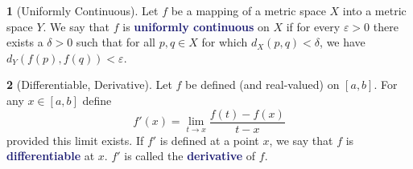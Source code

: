 \documentclass[12pt]{article}
\numberwithin{equation}{section}
\newcommand{\navy}[1]{\textcolor{MidnightBlue}{\bf #1}}
\theoremstyle{plain}
\theoremstyle{definition}
\newtheorem{definition}{\color{MidnightBlue}{\textbf{Definition}}}[section]
\newcommand{\1}{\mathbbm 1}
\def\d{\delta}
\newcommand{\e}{\varepsilon}
\begin{document}
\begin{definition}[Uniformly Continuous]
Let $f$ be a mapping of a metric space $X$ into a metric space $Y$. We say that $f$ is \navy{uniformly continuous} on $X$ if for every $\e > 0$ there exists a $\d > 0$ such that for all $p,q \in X$ for which $d_X(p,q) < \delta$, we have $d_Y(f(p),f(q)) < \e$.
\end{definition}

\begin{definition}[Differentiable, Derivative]
Let $f$ be defined (and real-valued) on $[a,b]$. For any $x \in [a,b]$ define
\begin{equation}
f'(x) = \lim_{t \to x} \frac{f(t) - f(x)}{t - x}
\end{equation}
provided this limit exists. If $f'$ is defined at a point $x$, we say that $f$ is \navy{differentiable} at $x$. $f'$ is called the \navy{derivative} of $f$.
\end{definition}
\end{document}
